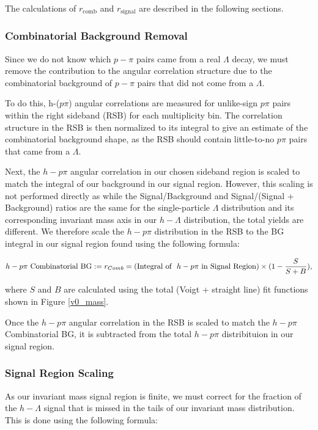 \documentclass[ALICE,manyauthors]{ALICE_analysis_notes}
\begin{document}
The calculations of $r_{\text{comb}}$ and $r_{\text{signal}}$ are described in the following sections.

\subsubsection{Combinatorial Background Removal}
Since we do not know which $p-\pi$ pairs came from a real $\Lambda$ decay, we must remove the contribution to the angular correlation structure due to the combinatorial background of $p-\pi$ pairs that did not come from a $\Lambda$.

To do this, h-($p\pi$) angular correlations are measured for unlike-sign $p\pi$ pairs within the right sideband (RSB) for each multiplicity bin. The correlation structure in the RSB is then normalized to its integral to give an estimate of the combinatorial background shape, as the RSB should contain little-to-no $p\pi$ pairs that came from a $\Lambda$. 

Next, the $h-p\pi$ angular correlation in our chosen sideband region is scaled to match the integral of our background in our signal region. However, this scaling is not performed directly as while the Signal/Background and Signal/(Signal + Background) ratios are the same for the single-particle $\Lambda$ distribution and its corresponding invariant mass axis in our $h-\Lambda$ distribution, the total yields are different. We therefore scale the $h-p\pi$ distribution in the RSB to the BG integral in our signal region found using the following formula:

\begin{align}
	h-p\pi \text{\space Combinatorial BG} := r_{Comb} = (\text{Integral of \space} h-p\pi \text{\space in Signal Region}) \times (1 - \frac{S}{S+B}),
\end{align}

where $S$ and $B$ are calculated using the total (Voigt + straight line) fit functions shown in Figure \ref{v0_mass}.

Once the $h-p\pi$ angular correlation in the RSB is scaled to match the $h-p\pi$ Combinatorial BG, it is subtracted from the total $h-p\pi$ distribituion in our signal region. 

\subsubsection{Signal Region Scaling}
As our invariant mass signal region is finite, we must correct for the fraction of the $h-\Lambda$ signal that is missed in the tails of our invariant mass distribution. This is done using the following formula:
\end{document}
